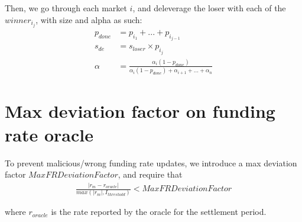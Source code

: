 \documentclass{article}%
\begin{document}
\begin{appendices}
Then, we go through each market $i$, and deleverage the loser with each of the $winner_{i_j}$, with size and alpha as such:
\begin{align*}
    p_{done} &= p_{i_1} + ... + p_{i_{j-1}}\\
    s_{de} &= s_{loser} \times p_{i_j}\\
    \alpha &= \frac{\alpha_i(1-p_{done})}{\alpha_i(1-p_{done}) + \alpha_{i+1} +...+ \alpha_{n}}
\end{align*}

\section{Max deviation factor on funding rate oracle}
To prevent malicious/wrong funding rate updates, we introduce a max deviation factor $MaxFRDeviationFactor$, and require that
\begin{align*}
    \frac{|r_m - r_{oracle}|}{max(|r_m|, I_{threshold})} < MaxFRDeviationFactor
\end{align*}

where $r_{oracle}$ is the rate reported by the oracle for the settlement period.
\end{appendices}

\medskip

\printbibliography[title={References}]
\end{document}
